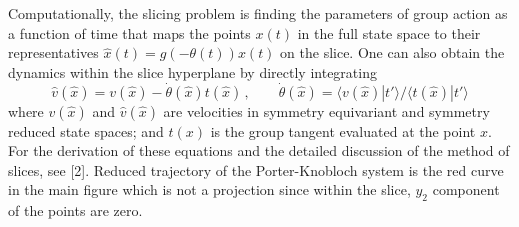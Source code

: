 \color{black}
\indent
Computationally, the slicing problem is finding the parameters of group action
as a function of time that maps the points $x(t)$ in the full state 
space to their representatives $\hat{x}(t) = g(-\theta(t)) x(t)$ on the slice.
One can also obtain the dynamics within the slice hyperplane by directly integrating
\begin{equation}
	\hat{v}(\hat{x}) = v(\hat{x}) - \dot{\theta} (\hat{x}) t(\hat{x}) 
	\, , \qquad
	\dot{\theta} (\hat{x}) = \langle v(\hat{x}) | t' \rangle / \langle t(\hat{x})  | t' \rangle
	\nonumber
\end{equation}  
where $v(\hat{x})$ and $\hat{v}(\hat{x})$ are velocities in symmetry equivariant
and symmetry reduced state spaces; and $t(x)$ is the group tangent evaluated
at the point $x$. For the derivation of these equations and the detailed
discussion of the method of slices, see [2].
Reduced trajectory of the Porter-Knobloch system is the red curve in the main
figure which is not a projection since within the slice, $y_2$ component of
the points are zero.
